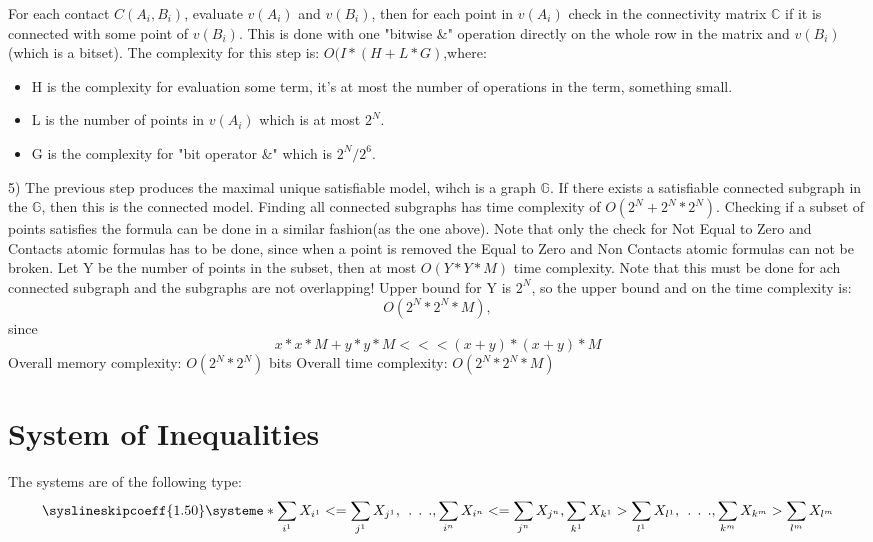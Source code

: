 \documentclass{article}
\begin{document}
			For each contact $C(A_i, B_i)$, evaluate $v(A_i)$ and $v(B_i)$, 
			then for each point in $v(A_i)$ check in the connectivity matrix $\mathbb{C}$
			if it is connected with some point of $v(B_i)$.
			This is done with one "bitwise \&" operation directly on the whole row in 
			the matrix and $v(B_i)$ (which is a bitset).
			\newline
			The complexity for this step is: $O(I * (H + L * G)$,where: 
			\begin{itemize}
				\item H is the complexity for evaluation some term, 
					it's at most the number of operations in the term, something small.
				\item L is the number of points in $v(A_i)$ which is at most $2^N$.
			       \item G is the complexity for "bit operator \&" which is $2^N/2^6$.
			\end{itemize}
		5) The previous step produces the maximal unique satisfiable model, wihch is a graph $\mathbb{G}$.
			If there exists a satisfiable connected subgraph in the $\mathbb{G}$, then this is the connected model.
			Finding all connected subgraphs has time complexity of $O(2^N + 2^N * 2^N)$.
			Checking if a subset of points satisfies the formula can be done in a similar fashion(as the one above).
			\newline
			Note that only the check for Not Equal to Zero and Contacts atomic formulas has to be done, 
			since when a point is removed the  Equal to Zero and Non Contacts atomic formulas can not be broken.
			\newline
			Let Y be the number of points in the subset, then at most $O(Y * Y * M)$ time complexity.
			Note that this must be done for ach connected subgraph and the subgraphs are not overlapping!
			Upper bound for Y is $2^N$, so the upper bound and on the time complexity is: 
			\begin{equation*}
				O(2^N * 2^N * M),
			\end{equation*}
			since 
			\begin{equation*}
				x * x * M + y * y * M <<< (x+y)*(x+y)*M
			\end{equation*}
			\newline
			\newline	
		Overall memory complexity: $O(2^N * 2^N)$ bits
		\newline
		Overall time complexity: $O(2^N * 2^N * M)$

	\newpage
	\section{System of Inequalities}
		The systems are of the following type:	
		\[
			\syslineskipcoeff{1.50}
			\systeme*{\sum_{i^1} X_{i^1} <= \sum_{j^1} X_{j^1},
				\:\:.\:\:.\:\:.,
				\sum_{i^n} X_{i^n} <= \sum_{j^n} X_{j^n}, 
				\sum_{k^1} X_{k^1} > \sum_{l^1} X_{l^1},
				\:\:.\:\:.\:\:.,
				\sum_{k^m} X_{k^m} > \sum_{l^m} X_{l^m}
				}
		\]
	
\end{document}
